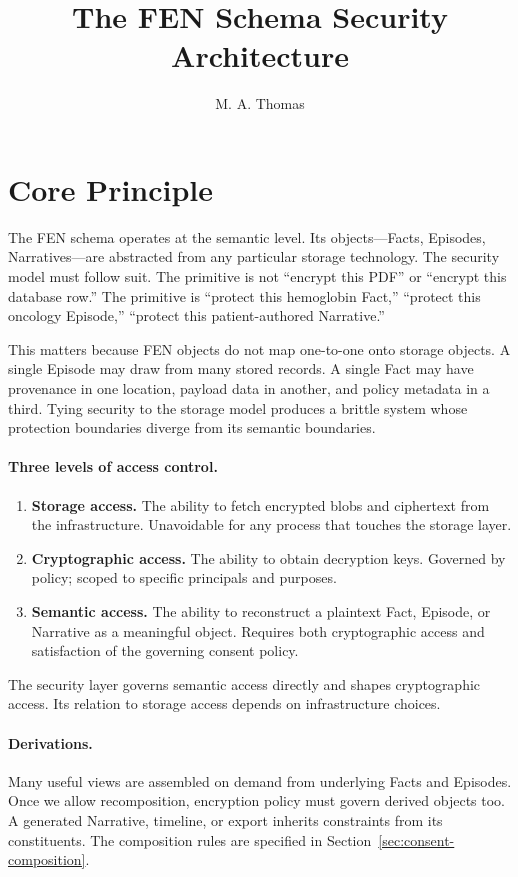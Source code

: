 \documentclass[11pt]{article}
\title{The FEN Schema Security Architecture}
\author{M. A. Thomas}
\date{}
\begin{document}
\maketitle

\section{Core Principle}

The FEN schema operates at the semantic level. Its objects---Facts,
Episodes, Narratives---are abstracted from any particular storage
technology. The security model must follow suit. The primitive is not
``encrypt this PDF'' or ``encrypt this database row.'' The primitive is
``protect this hemoglobin Fact,'' ``protect this oncology Episode,''
``protect this patient-authored Narrative.''

This matters because FEN objects do not map one-to-one onto storage
objects. A single Episode may draw from many stored records. A single
Fact may have provenance in one location, payload data in another, and
policy metadata in a third. Tying security to the storage model produces
a brittle system whose protection boundaries diverge from its semantic
boundaries.

\paragraph{Three levels of access control.}

\begin{enumerate}
\item \textbf{Storage access.} The ability to fetch encrypted blobs and
  ciphertext from the infrastructure. Unavoidable for any process that
  touches the storage layer.

\item \textbf{Cryptographic access.} The ability to obtain decryption
  keys. Governed by policy; scoped to specific principals and purposes.

\item \textbf{Semantic access.} The ability to reconstruct a plaintext
  Fact, Episode, or Narrative as a meaningful object. Requires both
  cryptographic access and satisfaction of the governing consent policy.
\end{enumerate}

The security layer governs semantic access directly and shapes
cryptographic access. Its relation to storage access depends on
infrastructure choices.

\paragraph{Derivations.}
Many useful views are assembled on demand from underlying Facts and
Episodes. Once we allow recomposition, encryption policy must govern
derived objects too. A generated Narrative, timeline, or export inherits
constraints from its constituents. The composition rules are specified in
Section~\ref{sec:consent-composition}.
\end{document}
